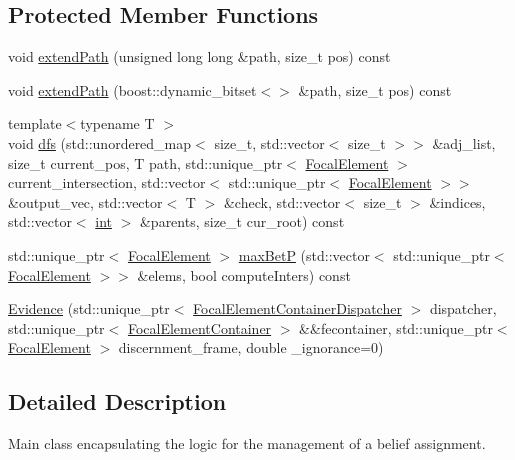 \subsection*{Protected Member Functions}
\begin{DoxyCompactItemize}
\item 
void \hyperlink{classEvidence_a3d0206e5bbb6e8e61ad766c43d6e9113}{extend\+Path} (unsigned long long \&path, size\+\_\+t pos) const 
\item 
void \hyperlink{classEvidence_ae732467027722ccd1a3bd690110e21a3}{extend\+Path} (boost\+::dynamic\+\_\+bitset$<$$>$ \&path, size\+\_\+t pos) const 
\item 
{\footnotesize template$<$typename T $>$ }\\void \hyperlink{classEvidence_aaf90200d5b72268052a4c3df429b1932}{dfs} (std\+::unordered\+\_\+map$<$ size\+\_\+t, std\+::vector$<$ size\+\_\+t $>$$>$ \&adj\+\_\+list, size\+\_\+t current\+\_\+pos, T path, std\+::unique\+\_\+ptr$<$ \hyperlink{classFocalElement}{Focal\+Element} $>$ current\+\_\+intersection, std\+::vector$<$ std\+::unique\+\_\+ptr$<$ \hyperlink{classFocalElement}{Focal\+Element} $>$$>$ \&output\+\_\+vec, std\+::vector$<$ T $>$ \&check, std\+::vector$<$ size\+\_\+t $>$ \&indices, std\+::vector$<$ \hyperlink{CMakeCache_8txt_a79a3d8790b2588b09777910863574e09}{int} $>$ \&parents, size\+\_\+t cur\+\_\+root) const 
\item 
std\+::unique\+\_\+ptr$<$ \hyperlink{classFocalElement}{Focal\+Element} $>$ \hyperlink{classEvidence_aa2580207b322e297cdd0c3af07ddcd21}{max\+BetP} (std\+::vector$<$ std\+::unique\+\_\+ptr$<$ \hyperlink{classFocalElement}{Focal\+Element} $>$$>$ \&elems, bool compute\+Inters) const 
\item 
\hyperlink{classEvidence_a8136cd1d58c59e4b6a5088e9ac581797}{Evidence} (std\+::unique\+\_\+ptr$<$ \hyperlink{classFocalElementContainerDispatcher}{Focal\+Element\+Container\+Dispatcher} $>$ dispatcher, std\+::unique\+\_\+ptr$<$ \hyperlink{classFocalElementContainer}{Focal\+Element\+Container} $>$ \&\&fecontainer, std\+::unique\+\_\+ptr$<$ \hyperlink{classFocalElement}{Focal\+Element} $>$ discernment\+\_\+frame, double \+\_\+ignorance=0)
\end{DoxyCompactItemize}


\subsection{Detailed Description}
Main class encapsulating the logic for the management of a belief assignment. 

